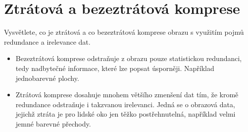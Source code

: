 \section{Ztrátová a bezeztrátová komprese}
Vysvětlete, co je ztrátová a co bezeztrátová komprese obrazu s využitím pojmů redundance a irelevance dat.

\begin{itemize}
    \item Bezeztrátová komprese odstraňuje z obrazu pouze statistickou redundanci, tedy nadbytečné informace, které lze 
    popsat úsporněji. Například jednobarevné plochy.
    \item Ztrátová komprese dosahuje mnohem většího zmenšení dat tím, že kromě redundance odstraňuje i takzvanou 
    irelevanci. Jedná se o obrazová data, jejichž ztráta je pro lidské oko jen těžko postřehnutelná, například velmi 
    jemné barevné přechody.
\end{itemize}